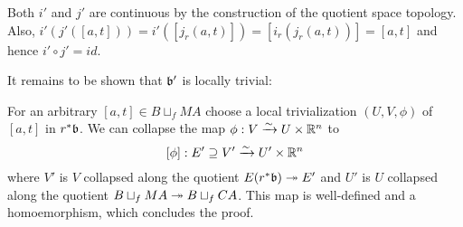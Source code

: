 \begin{myproof}
    Both $i'$ and $j'$ are continuous by the construction of the quotient space topology.
    Also, $i'(j'([a, t])) = i'([j_r(a, t)]) = [i_r(j_r(a, t))] = [a, t]$ and hence $i' \circ j' = id$.

    It remains to be shown that $\mathfrak{b}'$ is locally trivial:

    For an arbitrary $[a, t] \in B \sqcup_f MA$ choose a local trivialization $(U, V, \phi)$ of $[a, t]$ in $r^*\mathfrak{b}$.
    We can collapse the map $\phi: V \xrightarrow{\sim} U \times \mathbb{R}^n$ to
    \[ [\phi]: E' \supseteq{} V' \xrightarrow{\sim} U' \times \mathbb{R}^n \]
    where $V'$ is $V$ collapsed along the quotient $E(r^*\mathfrak{b}) \twoheadrightarrow{} E'$ and $U'$ is $U$ collapsed along the quotient $B \sqcup_f MA \twoheadrightarrow{} B \sqcup_f CA$.
    This map is well-defined and a homoemorphism, which concludes the proof.
\end{myproof}